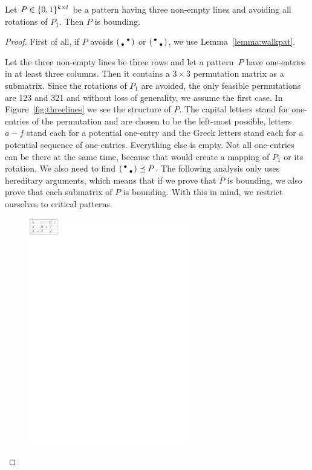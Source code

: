 \begin{lemma}
Let $P\in\{0,1\}^{k\times l}$ be a pattern having three non-empty lines and avoiding all rotations of $P_1$. Then $P$ is bounding.
\end{lemma}
\begin{proof}
First of all, if $P$ avoids $\left(\begin{smallmatrix} &\bullet\\\bullet& \end{smallmatrix}\right)$ or $\left(\begin{smallmatrix}\bullet& \\ &\bullet\end{smallmatrix}\right)$, we use Lemma~\ref{lemma:walkpat}.

Let the three non-empty lines be three rows and let a pattern~$P$ have one-entries in at least three columns. Then it contains a $3\times3$ permutation matrix as a submatrix. Since the rotations of $P_1$ are avoided, the only feasible permutations are 123 and 321 and without loss of generality, we assume the first case. In Figure~\ref{fig:threelines} we see the structure of $P$. The capital letters stand for one-entries of the permutation and are chosen to be the left-most possible, letters $a-f$ stand each for a potential one-entry and the Greek letters stand each for a potential sequence of one-entries. Everything else is empty. Not all one-entries can be there at the same time, because that would create a mapping of $P_1$ or its rotation. We also need to find $\left(\begin{smallmatrix}\bullet& \\ &\bullet\end{smallmatrix}\right)\preceq P$. The following analysis only uses hereditary arguments, which means that if we prove that $P$ is bounding, we also prove that each submatrix of $P$ is bounding. With this in mind, we restrict ourselves to critical patterns.
\begin{figure}[!ht]
	\centering
	\includegraphics[width=70mm]{img/threelines.pdf}

\end{figure}
\end{proof}
